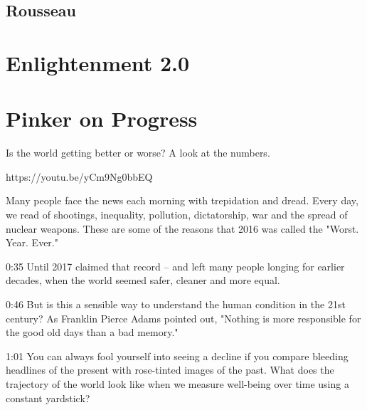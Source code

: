\documentclass[10pt,titlepage]{article}
\begin{document}
\subsection{Rousseau}

\section{Enlightenment 2.0}

\appendix

\section{Pinker on Progress}

Is the world getting better or worse? A look at the numbers.

https://youtu.be/yCm9Ng0bbEQ


Many people face the news each morning
with trepidation and dread.
Every day, we read of shootings,
inequality, pollution, dictatorship,
war and the spread of nuclear weapons.
These are some of the reasons
that 2016 was called the "Worst. Year. Ever."

0:35
Until 2017 claimed that record --
and left many people longing for earlier decades,
when the world seemed safer, cleaner and more equal.

0:46
But is this a sensible way to understand the human condition
in the 21st century?
As Franklin Pierce Adams pointed out,
"Nothing is more responsible for the good old days
than a bad memory."

1:01
You can always fool yourself into seeing a decline
if you compare bleeding headlines of the present
with rose-tinted images of the past.
What does the trajectory of the world look like
when we measure well-being over time using a constant yardstick?

\paragraph{}
\end{document}
